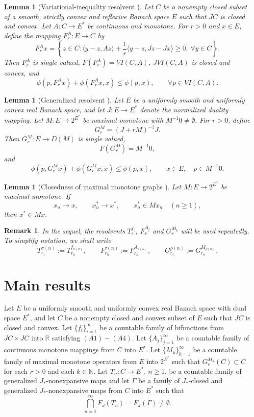 \documentclass[10pt,a4paper]{amsart}
\newtheorem{lemma}[theorem]{Lemma}
\newtheorem{remark}[theorem]{Remark}
\numberwithin{equation}{section}
\begin{document}
\begin{lemma}[Variational-inequality resolvent \cite{ZegeyeShahzad2014}]\label{VIrezolvent}
Let $C$ be a nonempty closed subset of a smooth, strictly convex and reflexive Banach space $E$ such that $JC$ is closed and convex. Let $A:C\to E^{*}$ be continuous and monotone. For $r>0$ and $x\in E$, define the mapping $F_r^A:E\to C$ by
\[
F_r^A x=\left\{z\in C:\langle y-z,Az\rangle+\frac{1}{r}\langle y-z,Jz-Jx\rangle\geq 0,\ \forall y\in C\right\}.
\]
Then $F_r^A$ is single valued, $F(F_r^A)=VI(C,A)$, $JVI(C,A)$ is closed and convex, and
\[
\phi(p,F_r^A x)+\phi(F_r^A x,x)\leq \phi(p,x),\qquad \forall p\in VI(C,A).
\]
\end{lemma}

\begin{lemma}[Generalized resolvent \cite{KamimuraKohsakaTakahashi2004,KohsakaTakahashi2004,AoyamaKimuraTakahashi2008}]\label{MMresolvent}
Let $E$ be a uniformly smooth and uniformly convex real Banach space, and let
$J:E\to E^*$ denote the normalized duality mapping. Let
$M:E\to 2^{E^{*}}$ be maximal monotone with $M^{-1}0\neq\emptyset$. For
$r>0$, define
\[
G_r^M=(J+rM)^{-1}J.
\]
Then $G_r^M:E\to D(M)$ is single valued,
\[
F(G_r^M)=M^{-1}0,
\]
and
\[
\phi(p,G_r^Mx)+\phi(G_r^Mx,x)\leq \phi(p,x),
\qquad x\in E,\quad p\in M^{-1}0.
\]
\end{lemma}

\begin{lemma}[Closedness of maximal monotone graphs \cite{Rockafellar1970,AlberRyazantseva2006}]\label{closedgraphM}
Let $M:E\to 2^{E^{*}}$ be maximal monotone. If
\[
x_n\to x,\qquad x_n^{*}\to x^{*},\qquad x_n^{*}\in Mx_n\quad(n\geq1),
\]
then $x^{*}\in Mx$.
\end{lemma}

\begin{remark}
In the sequel, the resolvents $T_r^{f_i}$, $F_r^{A_j}$ and $G_r^{M_k}$ will be used repeatedly. To simplify notation, we shall write
\[
T_{r_n}^{\sigma(n)}:=T_{r_n}^{f_{\sigma(n)}},\qquad
F_{r_n}^{\tau(n)}:=F_{r_n}^{A_{\tau(n)}},\qquad
G_{r_n}^{\rho(n)}:=G_{r_n}^{M_{\rho(n)}}.
\]
\end{remark}

\section{Main results}

Let $E$ be a uniformly smooth and uniformly convex real Banach space with dual space $E^{*}$, and let $C$ be a nonempty closed and convex subset of $E$ such that $JC$ is closed and convex. Let $\{f_i\}_{i=1}^{\infty}$ be a countable family of bifunctions from $JC\times JC$ into $\mathbb{R}$ satisfying $(A1)-(A4)$. Let $\{A_j\}_{j=1}^{\infty}$ be a countable family of continuous monotone mappings from $C$ into $E^{*}$. Let $\{M_k\}_{k=1}^{\infty}$ be a countable family of maximal monotone operators from $E$ into $2^{E^{*}}$ such that $G_r^{M_k}(C)\subset C$ for each $r>0$ and each $k\in\mathbb{N}$. Let $T_n:C\to E^{*}$, $n\geq1$, be a countable family of generalized $J_{*}$-nonexpansive maps and let $\Gamma$ be a family of $J_{*}$-closed and generalized $J_{*}$-nonexpansive maps from $C$ into $E^{*}$ such that
\[
\bigcap_{n=1}^{\infty}F_J(T_n)=F_J(\Gamma)\neq\emptyset.
\]
\end{document}
